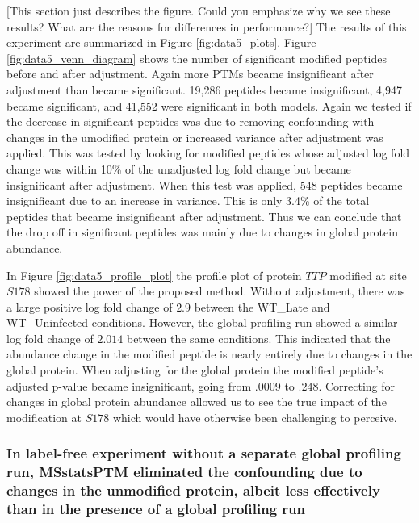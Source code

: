 \documentclass[mcp]{article}
\numberwithin{table}{section}
\def\todo#1{{\color{red}[#1]}}
\begin{document}
\todo{This section just describes the figure. Could you emphasize why we see these results? What are the reasons for differences in performance?} The results of this experiment are summarized in Figure \ref{fig:data5_plots}. Figure \ref{fig:data5_venn_diagram} shows the number of significant modified peptides before and after adjustment. Again more PTMs became insignificant after adjustment than became significant. 19,286 peptides became insignificant, 4,947 became significant, and 41,552 were significant in both models. Again we tested if the decrease in significant peptides was due to removing confounding with changes in the umodified protein or increased variance after adjustment was applied. This was tested by looking for modified peptides whose adjusted log fold change was within 10\% of the unadjusted log fold change but became insignificant after adjustment. When this test was applied, 548 peptides became insignificant due to an increase in variance. This is only 3.4\% of the total peptides that became insignificant after adjustment. Thus we can conclude that the drop off in significant peptides was mainly due to changes in global protein abundance.

In Figure \ref{fig:data5_profile_plot} the profile plot of protein $TTP$ modified at site $S178$ showed the power of the proposed method. Without adjustment, there was a large positive log fold change of $2.9$ between the WT\_Late and WT\_Uninfected conditions. However, the global profiling run showed a similar log fold change of $2.014$ between the same conditions. This indicated that the abundance change in the modified peptide is nearly entirely due to changes in the global protein. When adjusting for the global protein the modified peptide's adjusted p-value became insignificant, going from $.0009$ to $.248$. Correcting for changes in global protein abundance allowed us to see the true impact of the modification at $S178$ which would have otherwise been challenging to perceive.

\subsubsection*{In label-free experiment without a separate global profiling run, MSstatsPTM eliminated the confounding due to changes in the unmodified protein, albeit less effectively than in the presence of a global profiling run}
\end{document}
